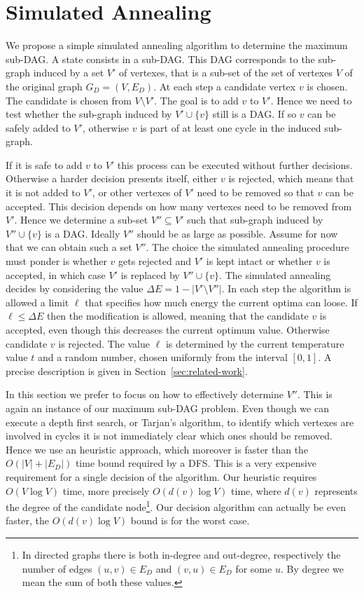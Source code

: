\documentclass[a4paper]{article}
\begin{document}
\section{Simulated Annealing}
\label{sec:my-idea}
%
We propose a simple simulated annealing algorithm to determine the maximum
sub-DAG. A state consists in a sub-DAG. This DAG corresponds to the
sub-graph induced by a set $V'$ of vertexes, that is a sub-set of the set
of vertexes $V$ of the original graph $G_D = (V, E_D)$. At each step a
candidate vertex $v$ is chosen. The candidate is chosen from $V \setminus
V'$. The goal is to add $v$ to $V'$. Hence we need to test whether the
sub-graph induced by $V' \cup \{v\}$ still is a DAG. If so $v$ can be
safely added to $V'$, otherwise $v$ is part of at least one cycle in the
induced sub-graph.

If it is safe to add $v$ to $V'$ this process can be executed without
further decisions. Otherwise a harder decision presents itself, either $v$
is rejected, which means that it is not added to $V'$, or other vertexes of
$V'$ need to be removed so that $v$ can be accepted. This decision depends
on how many vertexes need to be removed from $V'$. Hence we determine a
sub-set $V'' \subseteq V'$ such that sub-graph induced by $V'' \cup \{v\}$
is a DAG. Ideally $V''$ should be as large as possible. Assume for now that
we can obtain such a set $V''$. The choice the simulated annealing
procedure must ponder is whether $v$ gets rejected and $V'$ is kept intact
or whether $v$ is accepted, in which case $V'$ is replaced by $V'' \cup
\{v\}$. The simulated annealing decides by considering the value $\Delta
E=1-|V' \setminus V''|$. In each step the algorithm is allowed a limit
$\ell$ that specifies how much energy the current optima can loose. If
$\ell \leq \Delta E$ then the modification is allowed, meaning that the
candidate $v$ is accepted, even though this decreases the current optimum
value. Otherwise candidate $v$ is rejected. The value $\ell$ is determined
by the current temperature value $t$ and a random number, chosen uniformly
from the interval $[0,1]$. A precise description is given in
Section~\ref{sec:related-work}.

In this section we prefer to focus on how to effectively determine
$V''$. This is again an instance of our maximum sub-DAG problem. Even
though we can execute a depth first search, or Tarjan's algorithm, to
identify which vertexes are involved in cycles it is not immediately clear
which ones should be removed. Hence we use an heuristic approach, which
moreover is faster than the $O(|V|+|E_D|)$ time bound required by a
DFS. This is a very expensive requirement for a single decision of the
algorithm. Our heuristic requires $O(V \log V)$ time, more precisely
$O(d(v) \log V)$ time, where $d(v)$ represents the degree of the candidate
node\footnote{In directed graphs there is both in-degree and out-degree,
  respectively the number of edges $(u,v) \in E_D$ and $(v,u) \in E_D$ for
  some $u$. By degree we mean the sum of both these values.}.  Our decision
algorithm can actually be even faster, the $O(d(v) \log V)$ bound is for
the worst case.
\end{document}
